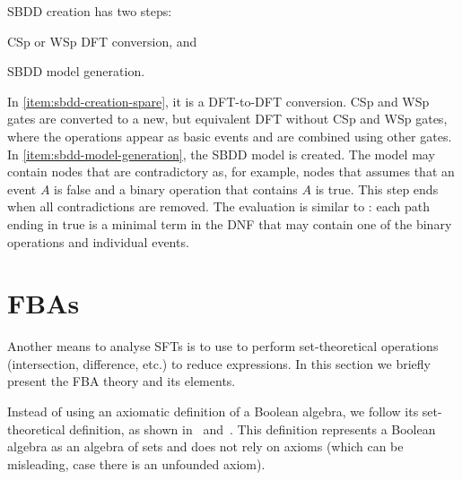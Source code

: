 \documentclass[12pt,openright,twoside,a4paper,oldfontcommands,english,brazil,final]{abntex2}
\theoremstyle{theo}
\begin{document}
\Ac{SBDD} creation has two steps:
\begin{alineasinline}
  \item \ac{CSp} or \ac{WSp} \ac{DFT} conversion, and \label{item:sbdd-creation-spare}
  \item \ac{SBDD} model generation.\label{item:sbdd-model-generation}
\end{alineasinline}
In \ref{item:sbdd-creation-spare}, it is a \ac{DFT}-to-\ac{DFT} conversion.
\Ac{CSp} and \ac{WSp} gates are converted to a new, but equivalent \ac{DFT} without \ac{CSp} and \ac{WSp} gates, where the operations appear as basic events and are combined using other gates.
In \ref{item:sbdd-model-generation}, the \ac{SBDD} model is created.
The model may contain nodes that are contradictory as, for example, nodes that assumes that an event $A$ is false and a binary operation that contains $A$ is true.
This step ends when all contradictions are removed.
The evaluation is similar to : each path ending in true is a minimal term in the \ac{DNF} that may contain one of the binary operations and individual events.


\section[Free Boolean Algebras]{\Aclp*{FBA}}
\label{sec:fba}

Another means to analyse \acp{SFT} is to use  to perform set-theoretical operations (intersection, difference, etc.) to reduce expressions.
In this section we briefly present the \ac{FBA} theory and its elements.

Instead of using an axiomatic definition of a Boolean algebra, we follow its set-theoretical definition, as shown in~\cite[pp. 254--258]{Stoll1979} and~\cite[pp. 8--11]{GH2009}.
This definition represents a Boolean algebra as an algebra of sets and does not rely on axioms (which can be misleading, case there is an unfounded axiom).
\end{document}

